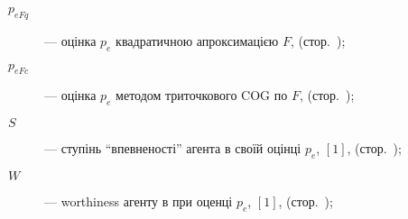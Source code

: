 \begin{description}
  \item[$p_{eFq} $]  ---
    оцінка $ p_e $ квадратичною апроксимацією $F$,
    (стор.~\pageref{atu:eq:p_eFq});

  \item[$p_{eFc} $]  ---
    оцінка $ p_e $ методом триточкового COG по $ F $,
    (стор.~\pageref{atu:eq:p_eFc});

  \item[$S$]  ---
  ступінь ``впевненості'' агента в своїй оцінці $ p_e $,
    $[1]$, (стор.~\pageref{atu:d:S});

  \item[$W$]  ---
    worthiness агенту в при оценці $p_e$,
    $[1]$, (стор.~\pageref{atu:d:W});



\end{description}



